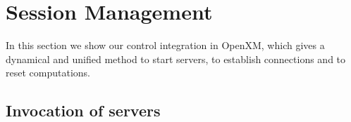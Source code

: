 
\section{Session Management}
\label{secsession}
 
In this section we show our control integration in
OpenXM, which gives a dynamical and unified
method to start servers, to establish connections and to reset
computations.

%

\subsection{Invocation of servers}
\label{launcher}

